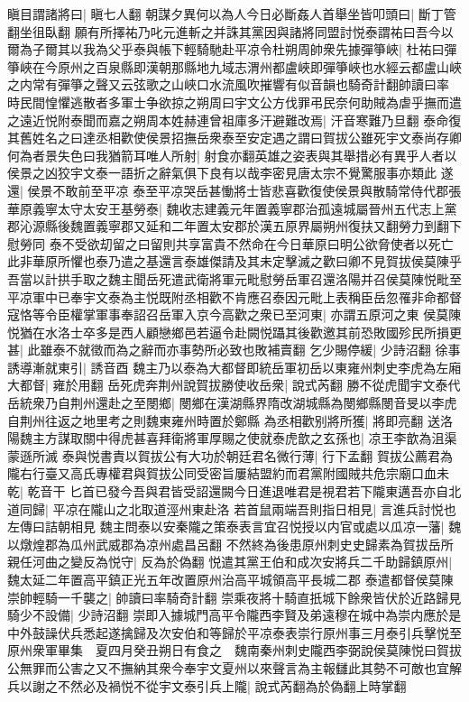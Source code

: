 瞋目謂諸將曰|{
	瞋七人翻}
朝謀夕異何以為人今日必斷姦人首舉坐皆叩頭曰|{
	斷丁管翻坐徂臥翻}
願有所擇祐乃叱元進斬之并誅其黨因與諸將同盟討悦泰謂祐曰吾今以爾為子爾其以我為父乎泰與帳下輕騎馳赴平凉令杜朔周帥衆先據彈箏峽|{
	杜祐曰彈箏峽在今原州之百泉縣即漢朝那縣地九域志渭州都盧峽即彈箏峽也水經云都盧山峽之内常有彈箏之聲又云弦歌之山峽口水流風吹摧響有似音韻也騎奇計翻帥讀曰率}
時民間惶懼逃散者多軍士争欲掠之朔周曰宇文公方伐罪弔民奈何助賊為虐乎撫而遣之遠近悦附泰聞而嘉之朔周本姓赫連曾祖庫多汗避難改焉|{
	汗音寒難乃旦翻}
泰命復其舊姓名之曰達丞相歡使侯景招撫岳衆泰至安定遇之謂曰賀拔公雖死宇文泰尚存卿何為者景失色曰我猶箭耳唯人所射|{
	射食亦翻英雄之姿表與其舉措必有異乎人者以侯景之凶狡宇文泰一語折之辭氣俱下良有以哉李密見唐太宗不覺驚服事亦類此}
遂還|{
	侯景不敢前至平凉}
泰至平凉哭岳甚慟將士皆悲喜歡復使侯景與散騎常侍代郡張華原義寧太守太安王基勞泰|{
	魏收志建義元年置義寧郡治孤遠城屬晉州五代志上黨郡沁源縣後魏置義寧郡又延和二年置太安郡於漢五原界屬朔州復扶又翻勞力到翻下慰勞同}
泰不受欲刧留之曰留則共享富貴不然命在今日華原曰明公欲脅使者以死亡此非華原所懼也泰乃遣之基還言泰雄傑請及其未定擊滅之歡曰卿不見賀拔侯莫陳乎吾當以計拱手取之魏主聞岳死遣武衛將軍元毗慰勞岳軍召還洛陽并召侯莫陳悦毗至平凉軍中已奉宇文泰為主悦既附丞相歡不肯應召泰因元毗上表稱臣岳忽罹非命都督寇恪等令臣權掌軍事奉詔召岳軍入京今高歡之衆已至河東|{
	亦謂五原河之東}
侯莫陳悦猶在水洛士卒多是西人顧戀鄉邑若逼令赴闕悦躡其後歡邀其前恐敗國殄民所損更甚|{
	此雖泰不就徵而為之辭而亦事勢所必致也敗補賣翻}
乞少賜停緩|{
	少詩沼翻}
徐事誘導漸就東引|{
	誘音酉}
魏主乃以泰為大都督即統岳軍初岳以東雍州刺史李虎為左廂大都督|{
	雍於用翻}
岳死虎奔荆州說賀拔勝使收岳衆|{
	說式芮翻}
勝不從虎聞宇文泰代岳統衆乃自荆州還赴之至閿鄉|{
	閿鄉在漢湖縣界隋改湖城縣為閿鄉縣閿音旻以李虎自荆州往返之地里考之則魏東雍州時置於鄭縣}
為丞相歡别將所獲|{
	將即亮翻}
送洛陽魏主方謀取關中得虎甚喜拜衛將軍厚賜之使就泰虎歆之玄孫也|{
	凉王李歆為沮渠蒙遜所滅}
泰與悦書責以賀拔公有大功於朝廷君名微行薄|{
	行下孟翻}
賀拔公薦君為隴右行臺又高氏專權君與賀拔公同受密旨屢結盟約而君黨附國賊共危宗廟口血未乾|{
	乾音干}
匕首已發今吾與君皆受詔還闕今日進退唯君是視君若下隴東邁吾亦自北道同歸|{
	平凉在隴山之北取道涇州東赴洛}
若首鼠兩端吾則指日相見|{
	言進兵討悦也左傳曰詰朝相見}
魏主問泰以安秦隴之策泰表言宜召悦授以内官或處以瓜凉一藩|{
	魏以燉煌郡為瓜州武威郡為凉州處昌呂翻}
不然終為後患原州刺史史歸素為賀拔岳所親任河曲之變反為悦守|{
	反為於偽翻}
悦遣其黨王伯和成次安將兵二千助歸鎮原州|{
	魏太延二年置高平鎮正光五年改置原州治高平城領高平長城二郡}
泰遣都督侯莫陳崇帥輕騎一千襲之|{
	帥讀曰率騎奇計翻}
崇乘夜將十騎直扺城下餘衆皆伏於近路歸見騎少不設備|{
	少詩沼翻}
崇即入據城門高平令隴西李賢及弟遠穆在城中為崇内應於是中外鼓譟伏兵悉起遂擒歸及次安伯和等歸於平凉泰表崇行原州事三月泰引兵擊悦至原州衆軍畢集　夏四月癸丑朔日有食之　魏南秦州刺史隴西李弼說侯莫陳悦曰賀拔公無罪而公害之又不撫納其衆今奉宇文夏州以來聲言為主報讎此其勢不可敵也宜解兵以謝之不然必及禍悦不從宇文泰引兵上隴|{
	說式芮翻為於偽翻上時掌翻}
